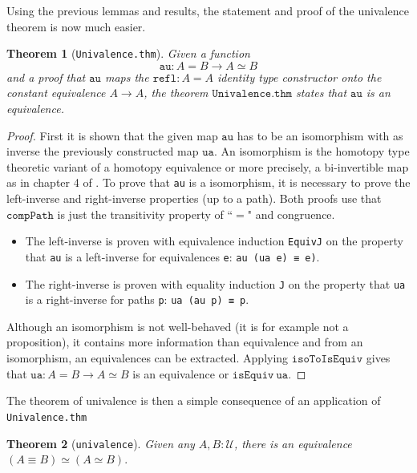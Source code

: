 \documentclass[12pt,a4paper,twoside,xetex]{book} %
\newtheorem{theorem}{Theorem}[section]
\newcommand{\op}[1]{\mathtt{#1}}
\begin{document}
Using the previous lemmas and results, the statement and proof of the 
univalence theorem is now much easier.

\begin{theorem}[\texttt{Univalence.thm}]
Given a function  $$\op{au} : A = B \rightarrow A \simeq B$$ and a proof that 
$\op{au}$ maps the $\op{refl} : A = A$ identity type constructor onto the 
constant equivalence $A \rightarrow A$, the theorem $\op{Univalence.thm}$ 
states that $\op{au}$ is an equivalence.
\end{theorem}

\begin{proof}
First it is shown that the given map $\op{au}$ has to be an isomorphism with as 
inverse the previously constructed map $\op{ua}$. An isomorphism is the 
homotopy type theoretic variant of a homotopy equivalence or more precisely, a 
bi-invertible map as in chapter 4 of \cite{Voevodsky2013}. To prove that 
\texttt{au} is a isomorphism, it is necessary to prove the left-inverse and 
right-inverse properties (up to a path). Both proofs use that $\op{compPath}$ 
is just the transitivity property of ``$=$" and congruence. 
\begin{itemize}
\item The left-inverse is proven with equivalence induction \texttt{EquivJ} on 
the property that \texttt{au} is a left-inverse for equivalences \texttt{e}: 
\texttt{au (ua e) ≡ e)}. 
\item The right-inverse is proven with equality induction \texttt{J} on the 
property that \texttt{ua} is a right-inverse for paths \texttt{p}: \texttt{ua 
(au p) ≡ p}. 
\end{itemize}
Although an isomorphism is not well-behaved (it is for example not a 
proposition), it contains more information than equivalence and from an 
isomorphism, an equivalences can be extracted. Applying $\op{isoToIsEquiv}$ 
gives that $\op{ua} : A = B \rightarrow A \simeq B$ is an equivalence or 
$\op{isEquiv}\ \op{ua}$. 
\end{proof}

The theorem of univalence is then a simple consequence of an application of 
\texttt{Univalence.thm}

\begin{theorem}[\texttt{univalence}]
Given any $A,B : \mathcal{U}$, there is an equivalence $\left( A \equiv B 
\right) \simeq \left( A \simeq B \right).$
\end{theorem}
\end{document}
